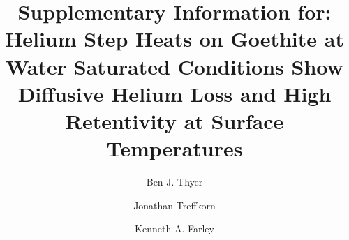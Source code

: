 \documentclass[preprint,12pt,authoryear]{elsarticle}
\begin{document}
\nolinenumbers

\begin{frontmatter}
\title{Supplementary Information for: Helium Step Heats on Goethite at Water Saturated Conditions Show Diffusive Helium Loss and High Retentivity at Surface Temperatures}
\author[caltech]{Ben J. Thyer}
\author[caltech]{Jonathan Treffkorn}
\author[caltech]{Kenneth A. Farley}
\end{frontmatter}





\end{document}

